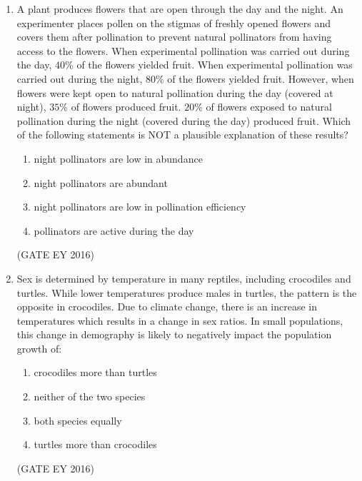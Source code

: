 \documentclass[journal]{IEEEtran}
\begin{document}
\begin{enumerate}
\item A plant produces flowers that are open through the day and the night. An experimenter places pollen on the stigmas of freshly opened flowers and covers them after pollination to prevent natural pollinators from having access to the flowers. When experimental pollination was carried out during the day, $40$\% of the flowers yielded fruit. When experimental pollination was carried out during the night, $80$\% of the flowers yielded fruit. However, when flowers were kept open to natural pollination during the day (covered at night), $35$\% of flowers produced fruit. $20$\% of flowers exposed to natural pollination during the night (covered during the day) produced fruit. Which of the following statements is NOT a plausible explanation of these results?
\begin{enumerate}
    \item night pollinators are low in abundance
    \item night pollinators are abundant
    \item night pollinators are low in pollination efficiency
    \item pollinators are active during the day
\end{enumerate}
\hfill{(GATE EY 2016)}

\item Sex is determined by temperature in many reptiles, including crocodiles and turtles. While lower temperatures produce males in turtles, the pattern is the opposite in crocodiles. Due to climate change, there is an increase in temperatures which results in a change in sex ratios. In small populations, this change in demography is likely to negatively impact the population growth of:
\begin{enumerate}
    \item crocodiles more than turtles
    \item neither of the two species
    \item both species equally
    \item turtles more than crocodiles
\end{enumerate}
\hfill{(GATE EY 2016)}


\end{enumerate}
\end{document}
